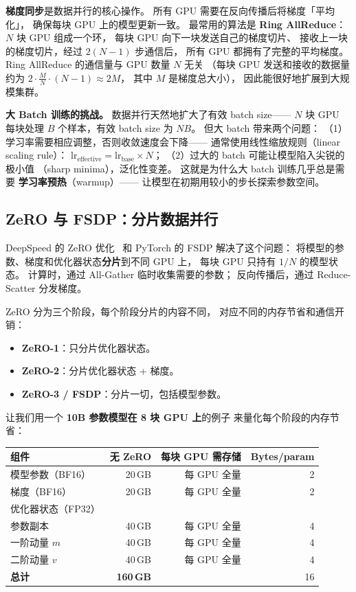 \textbf{梯度同步}是数据并行的核心操作。
所有 GPU 需要在反向传播后将梯度「平均化」，
确保每块 GPU 上的模型更新一致。
最常用的算法是 \textbf{Ring AllReduce}：
$N$ 块 GPU 组成一个环，
每块 GPU 向下一块发送自己的梯度切片、
接收上一块的梯度切片，经过 $2(N-1)$ 步通信后，
所有 GPU 都拥有了完整的平均梯度。
Ring AllReduce 的通信量与 GPU 数量 $N$ 无关
（每块 GPU 发送和接收的数据量约为 $2 \cdot \frac{M}{N} \cdot (N-1) \approx 2M$，
其中 $M$ 是梯度总大小），
因此能很好地扩展到大规模集群。

\textbf{大 Batch 训练的挑战。}
数据并行天然地扩大了有效 batch size——
$N$ 块 GPU 每块处理 $B$ 个样本，有效 batch size 为 $NB$。
但大 batch 带来两个问题：
（1）学习率需要相应调整，否则收敛速度会下降——
通常使用线性缩放规则（linear scaling rule）：
$\mathrm{lr}_{\mathrm{effective}} = \mathrm{lr}_{\mathrm{base}} \times N$；
（2）过大的 batch 可能让模型陷入尖锐的极小值
（sharp minima），泛化性变差。
这就是为什么大 batch 训练几乎总是需要
\textbf{学习率预热}（warmup）——
让模型在初期用较小的步长探索参数空间。

\subsection{ZeRO 与 FSDP：分片数据并行}

DeepSpeed 的 ZeRO 优化~\cite{rajbhandari2020zero}
和 PyTorch 的 FSDP 解决了这个问题：
将模型的参数、梯度和优化器状态\textbf{分片}到不同 GPU 上，
每块 GPU 只持有 $1/N$ 的模型状态。
计算时，通过 All-Gather 临时收集需要的参数；
反向传播后，通过 Reduce-Scatter 分发梯度。

ZeRO 分为三个阶段，每个阶段分片的内容不同，
对应不同的内存节省和通信开销：

\begin{itemize}[noitemsep]
  \item \textbf{ZeRO-1}：只分片优化器状态。
  \item \textbf{ZeRO-2}：分片优化器状态 + 梯度。
  \item \textbf{ZeRO-3 / FSDP}：分片一切，包括模型参数。
\end{itemize}

让我们用一个 \textbf{10B 参数模型在 8 块 GPU 上}的例子
来量化每个阶段的内存节省：

\begin{center}
\begin{tabular}{lrrr}
  \hline
  \textbf{组件} & \textbf{无 ZeRO} & \textbf{每块 GPU 需存储} & \textbf{Bytes/param} \\
  \hline
  模型参数（BF16） & 20\,GB & 每 GPU 全量 & 2 \\
  梯度（BF16） & 20\,GB & 每 GPU 全量 & 2 \\
  优化器状态（FP32） & & & \\
  \quad 参数副本 & 40\,GB & 每 GPU 全量 & 4 \\
  \quad 一阶动量 $m$ & 40\,GB & 每 GPU 全量 & 4 \\
  \quad 二阶动量 $v$ & 40\,GB & 每 GPU 全量 & 4 \\
  \hline
  \textbf{总计} & \textbf{160\,GB} & & 16 \\
  \hline
\end{tabular}
\end{center}

